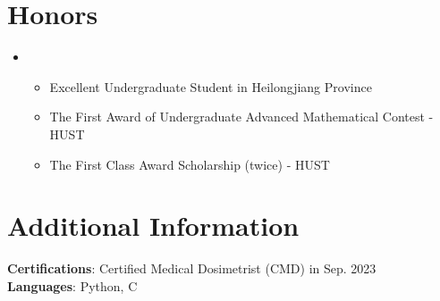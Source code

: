 \documentclass[letterpaper,11pt]{article}
\newcommand{\resumeItem}[1]{
  \item\small{
    {#1 \vspace{-2pt}}
  }
}
\newcommand{\resumeSubHeadingListStart}{\begin{itemize}[leftmargin=0.15in, label={}]}
\newcommand{\resumeSubHeadingListEnd}{\end{itemize}}
\newcommand{\resumeItemListStart}{\begin{itemize}}
\newcommand{\resumeItemListEnd}{\end{itemize}\vspace{-5pt}}
\begin{document}
\section{Honors}
\resumeSubHeadingListStart
\item{}
\resumeItemListStart
\resumeItem{Excellent Undergraduate Student in Heilongjiang Province}
\resumeItem{The First Award of Undergraduate Advanced Mathematical Contest - HUST}
\resumeItem{The First Class Award Scholarship (twice) - HUST}
\resumeItemListEnd
\resumeSubHeadingListEnd


%
\section{Additional Information}
\begin{itemize}[leftmargin=0.15in, label={}]
\small{\item{
\textbf{Certifications}{: Certified Medical Dosimetrist (CMD) in Sep. 2023} \\
\textbf{Languages}{: Python, C} \\
}}
\end{itemize}


\end{document}

